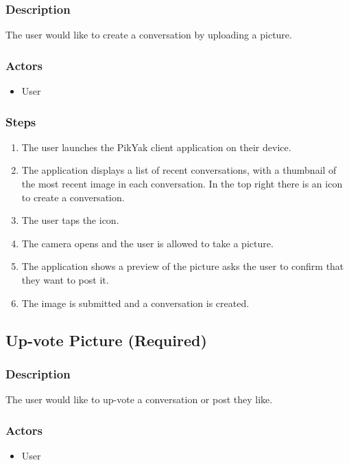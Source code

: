 \documentclass[11pt]{scrartcl}
\begin{document}
        \subsubsection{Description}
            The user would like to create a conversation by uploading a picture.
        \subsubsection{Actors}
            \begin{itemize}
                \item User
            \end{itemize}
        \subsubsection{Steps}
            \begin{enumerate}
                \item The user launches the PikYak client application on their device.
                \item The application displays a list of recent conversations, with a thumbnail of the most recent image in each conversation. In the top right there is an icon to create a conversation.
                \item The user taps the icon.
                \item The camera opens and the user is allowed to take a picture.
                \item The application shows a preview of the picture asks the user to confirm that they want to post it.
                \item The image is submitted and a conversation is created.
            \end{enumerate}
    
    \subsection{Up-vote Picture (Required)}
    \label{sec:upvote}
        \subsubsection{Description}
            The user would like to up-vote a conversation or post they like.
        \subsubsection{Actors}
            \begin{itemize}
                \item User
            \end{itemize}
\end{document}
